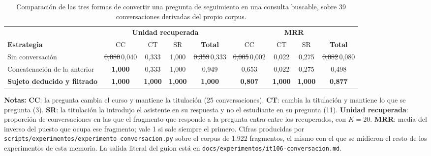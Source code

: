 \begin{table}[htbp]
  \centering
  \caption{\textcolor{borrador2}{Comparación de las tres formas de convertir una
      pregunta de seguimiento en una consulta buscable, sobre 39 conversaciones
      derivadas del propio corpus.}}
  \label{tab:conversacion}
  \small
  \begin{tabular}{@{}l cccc cccc@{}}
    \toprule
                                    & \multicolumn{4}{c}{\textbf{Unidad recuperada}} & \multicolumn{4}{c}{\textbf{MRR}}                                                                                                     \\
    \cmidrule(lr){2-5} \cmidrule(lr){6-9}
    \textbf{Estrategia}             & CC                                             & CT                               & SR    & \textbf{Total} & CC    & CT    & SR    & \textbf{Total} \\
    \midrule
    Sin conversación                & \sout{0,080}\,\textcolor{borrador2}{0,040}     & 0,333                            & 1,000 & \sout{0,359}\,\textcolor{borrador2}{0,333} & \sout{0,005}\,\textcolor{borrador2}{0,002} & 0,022 & 0,275 & \sout{0,082}\,\textcolor{borrador2}{0,080} \\
    Concatenación de la anterior    & \textbf{1,000}                                 & 0,333                            & 1,000 & 0,949          & 0,653 & 0,022 & 0,275 & 0,498          \\
    \textbf{Sujeto deducido y filtrado} & \textbf{1,000}                             & \textbf{1,000}                   & \textbf{1,000} & \textbf{1,000} & \textbf{0,807} & \textbf{1,000} & \textbf{1,000} & \textbf{0,877} \\
    \bottomrule
  \end{tabular}
  \begin{minipage}{0.95\textwidth}
    \vspace{4pt}
    \tiny
    \textbf{Notas:} \textbf{CC}: la pregunta cambia el curso y mantiene la
    titulación (25 conversaciones). \textbf{CT}: cambia la titulación y mantiene
    lo que se pregunta (3). \textbf{SR}: la titulación la introdujo el asistente
    en su respuesta y no el estudiante en su pregunta (11).
    \textbf{Unidad recuperada}: proporción de conversaciones en las que el
    fragmento que responde a la pregunta entra entre los recuperados, con
    $K = 20$. \textbf{MRR}: media del inverso del puesto que ocupa ese fragmento;
    vale 1 si sale siempre el primero. \textcolor{borrador2}{Cifras producidas
      por \texttt{scripts/experimentos/experimento\_conversacion.py} sobre el
      corpus de 1.922 fragmentos, el mismo con el que se midieron el resto de
      los experimentos de esta memoria. La salida literal del guion está en
      \texttt{docs/experimentos/it106-conversacion.md}\cite{repo_tfg}.}
  \end{minipage}
\end{table}

